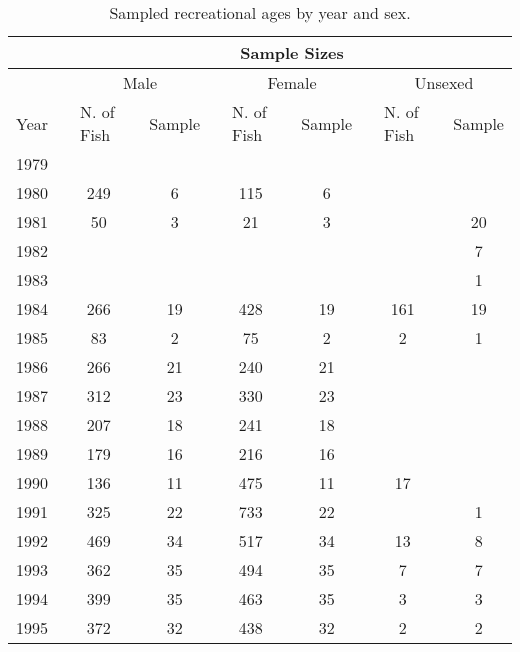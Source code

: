 \begingroup\fontsize{10}{12}\selectfont
\begingroup\fontsize{10}{12}\selectfont

\begin{table}[]
\caption{Sampled recreational ages by year and sex.}
\label{tab:rec_age_sample}
\begin{tabular}{rlclccccccccc}
\hline
\multicolumn{1}{l}{} &  & \multicolumn{11}{c}{Sample Sizes} \\ \hline
\multicolumn{1}{l}{} &  & \multicolumn{3}{c}{Male} & \multicolumn{1}{l}{} & \multicolumn{3}{c}{Female} & \multicolumn{1}{l}{} & \multicolumn{3}{c}{Unsexed} \\ \cline{3-5} \cline{7-9} \cline{11-13} 
\multicolumn{1}{l}{Year} &  & \multicolumn{1}{l}{N. of  Fish} &  & \multicolumn{1}{l}{Sample} & \multicolumn{1}{l}{} & \multicolumn{1}{l}{N. of Fish} & \multicolumn{1}{l}{} & \multicolumn{1}{l}{Sample} & \multicolumn{1}{l}{} & \multicolumn{1}{l}{N. of Fish} & \multicolumn{1}{l}{} & \multicolumn{1}{l}{Sample} \\ \hline
1979 &  &  &  &  &  &  &  &  &  &  &  &  \\
1980 &  & 249 &  & 6 &  & 115 &  & 6 &  &  &  &  \\
1981 &  & 50 &  & 3 &  & 21 &  & 3 &  &  &  & 20 \\
1982 &  &  &  &  &  &  &  &  &  &  &  & 7 \\
1983 &  &  &  &  &  &  &  &  &  &  &  & 1 \\
1984 &  & 266 &  & 19 &  & 428 &  & 19 &  & 161 &  & 19 \\
1985 &  & 83 &  & 2 &  & 75 &  & 2 &  & 2 &  & 1 \\
1986 &  & 266 &  & 21 &  & 240 &  & 21 &  &  &  &  \\
1987 &  & 312 &  & 23 &  & 330 &  & 23 &  &  &  &  \\
1988 &  & 207 &  & 18 &  & 241 &  & 18 &  &  &  &  \\
1989 &  & 179 &  & 16 &  & 216 &  & 16 &  &  &  &  \\
1990 &  & 136 &  & 11 &  & 475 &  & 11 &  & 17 &  &  \\
1991 &  & 325 &  & 22 &  & 733 &  & 22 &  &  &  & 1 \\
1992 &  & 469 &  & 34 &  & 517 &  & 34 &  & 13 &  & 8 \\
1993 &  & 362 &  & 35 &  & 494 &  & 35 &  & 7 &  & 7 \\
1994 &  & 399 &  & 35 &  & 463 &  & 35 &  & 3 &  & 3 \\
1995 &  & 372 &  & 32 &  & 438 &  & 32 &  & 2 &  & 2 \\

\end{tabular}
\end{table}
